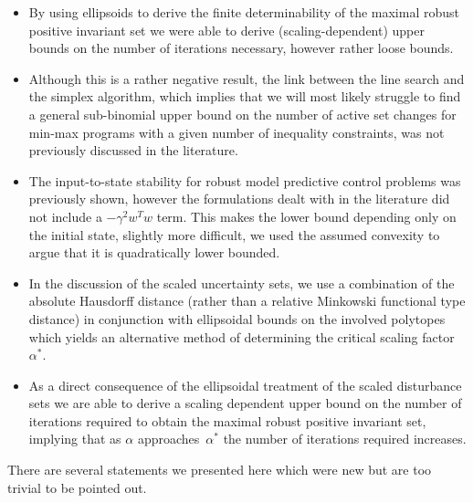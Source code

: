 \begin{itemize}
\item By using ellipsoids to derive the finite determinability of the maximal robust positive invariant set we were able to derive (scaling-dependent) upper bounds on the number of iterations necessary, however rather loose bounds.
%
\item Although this is a rather negative result, the link between the line search and the simplex algorithm, which implies that we will most likely struggle to find a general sub-binomial upper bound on the number of active set changes for min-max programs with a given number of inequality constraints, was not previously discussed in the literature.
%
\item The input-to-state stability for robust model predictive control problems was previously shown, however the formulations dealt with in the literature did not include a $-\gamma^2 w^Tw$ term.
%
This makes the lower bound depending only on the initial state, slightly more difficult, we used the assumed convexity to argue that it is quadratically lower bounded.
%
\item In the discussion of the scaled uncertainty sets, we use a combination of the absolute Hausdorff distance (rather than a relative Minkowski functional type distance) in conjunction with ellipsoidal bounds on the involved polytopes which yields an alternative method of determining the critical scaling factor~$\alpha^\ast$.
%
\item As a direct consequence of the ellipsoidal treatment of the scaled disturbance sets we are able to derive a scaling dependent upper bound on the number of iterations required to obtain the maximal robust positive invariant set, implying that as $\alpha$ approaches~$\alpha^\ast$ the number of iterations required increases.
\end{itemize}
%
There are several statements we presented here which were new but are too trivial to be pointed out.
%
%
%
%
%
